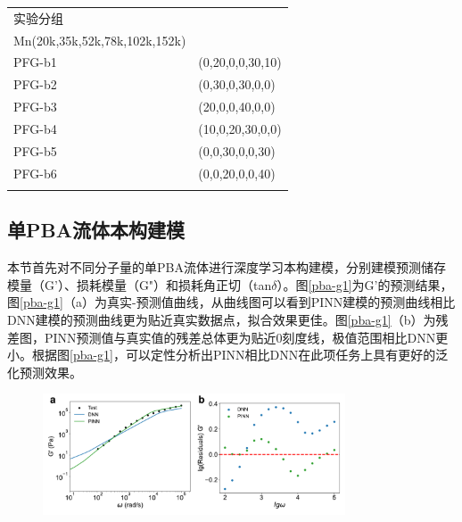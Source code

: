 \begin{table}
  \centering
  \small
  \begin{tabularx}{\textwidth}{>{\centering\arraybackslash}X >{\centering\arraybackslash}X} %
    \Xhline{1.5pt}
    实验分组   & \makecell{
      \begin{tabular}{@{}c@{}}
        $\phi_{PBA}(\%)$ \\
        \Xhline{0.5pt}
        Mn(20k,35k,52k,78k,102k,152k)
      \end{tabular}
    }                         \\
    \Xhline{0.5pt}
    PFG-b1 & (0,20,0,0,30,10) \\
    PFG-b2 & (0,30,0,30,0,0)  \\
    PFG-b3 & (20,0,0,40,0,0)  \\
    PFG-b4 & (10,0,20,30,0,0) \\
    PFG-b5 & (0,0,30,0,0,30)  \\
    PFG-b6 & (0,0,20,0,0,40)  \\
    \Xhline{1.5pt}
  \end{tabularx}
\end{table}

\subsection{单PBA流体本构建模}
本节首先对不同分子量的单PBA流体进行深度学习本构建模，分别建模预测储存模量（G'）、损耗模量（G"）和损耗角正切（tan$\delta$）。图\ref{pba-g1}为G'的预测结果，图\ref{pba-g1}（a）为真实-预测值曲线，从曲线图可以看到PINN建模的预测曲线相比DNN建模的预测曲线更为贴近真实数据点，拟合效果更佳。图\ref{pba-g1}（b）为残差图，PINN预测值与真实值的残差总体更为贴近0刻度线，极值范围相比DNN更小。根据图\ref{pba-g1}，可以定性分析出PINN相比DNN在此项任务上具有更好的泛化预测效果。
\begin{figure}[htbp]
  \centering
  \includegraphics[width=0.8\textwidth]{Fig/pba-g1.pdf}
\end{figure}

